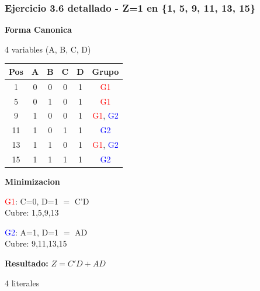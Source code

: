 \documentclass[12pt,a4paper]{article}
\begin{document}
\vspace{0.5cm}

\subsubsection{Ejercicio 3.6 detallado - Z=1 en \{1, 5, 9, 11, 13, 15\}}

\vspace{0.3cm}

\begin{minipage}[t]{0.58\textwidth}
\textbf{Forma Canonica}

4 variables (A, B, C, D)

\begin{tabular}{|c|c|c|c|c|c|}
\hline
Pos & A & B & C & D & Grupo \\
\hline
1  & 0 & 0 & 0 & 1 & \textcolor{red}{G1} \\
5  & 0 & 1 & 0 & 1 & \textcolor{red}{G1} \\
9  & 1 & 0 & 0 & 1 & \textcolor{red}{G1}, \textcolor{blue}{G2} \\
11 & 1 & 0 & 1 & 1 & \textcolor{blue}{G2} \\
13 & 1 & 1 & 0 & 1 & \textcolor{red}{G1}, \textcolor{blue}{G2} \\
15 & 1 & 1 & 1 & 1 & \textcolor{blue}{G2} \\
\hline
\end{tabular}
\end{minipage}
\hspace{0.3cm}
\begin{minipage}[t]{0.38\textwidth}
\textbf{Minimizacion}

\vspace{0.2cm}
\textcolor{red}{G1}: C=0, D=1 $=$ C'D \\ Cubre: 1,5,9,13

\vspace{0.2cm}
\textcolor{blue}{G2}: A=1, D=1 $=$ AD \\ Cubre: 9,11,13,15

\vspace{0.3cm}
\textbf{Resultado:} $Z = C'D + AD$

4 literales
\end{minipage}

\vspace{0.5cm}
\end{document}
